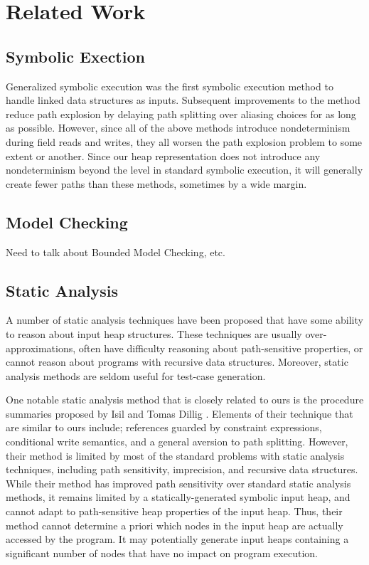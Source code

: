 \section{Related Work}
\label{related}

\subsection{Symbolic Exection}
Generalized symbolic execution \cite{GSE03} was the first symbolic execution method to handle linked data structures as inputs. Subsequent improvements to the method \cite{Deng:2006,Deng:2007} reduce path explosion by delaying path splitting over aliasing choices for as long as possible. However, since all of the above methods introduce nondeterminism during field reads and writes, they all worsen the path explosion problem to some extent or another. Since our heap representation does not introduce any nondeterminism beyond the level in standard symbolic execution, it will generally create fewer paths than these methods, sometimes by a wide margin.

\subsection{Model Checking}
Need to talk about Bounded Model Checking, etc.

\subsection{Static Analysis}
A number of static analysis techniques have been proposed that have some ability to reason about input heap structures. These techniques are usually over-approximations, often have difficulty reasoning about path-sensitive properties, or cannot reason about programs with recursive data structures. Moreover, static analysis methods are seldom useful for test-case generation.

One notable static analysis method that is closely related to ours is the procedure summaries proposed by Isil and Tomas Dillig \cite{Dillig:2011}. Elements of their technique that are similar to ours include; references guarded by constraint expressions, conditional write semantics, and a general aversion to path splitting. However, their method is limited by most of the standard problems with static analysis techniques, including path sensitivity, imprecision, and recursive data structures. While their method has improved path sensitivity over standard static analysis methods, it remains limited by a statically-generated symbolic input heap, and cannot adapt to path-sensitive heap properties of the input heap. Thus, their method cannot determine a priori which nodes in the input heap are actually accessed by the program. It may potentially generate input heaps containing a significant number of nodes that have no impact on program execution.


